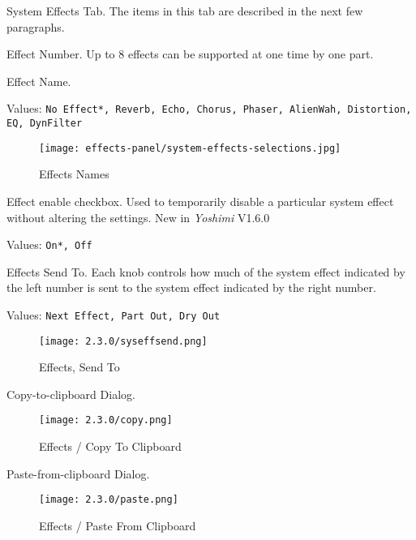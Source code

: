    \setcounter{ItemCounter}{0}      %

   System Effects Tab.
   The items in this tab are described in the next few paragraphs.

   Effect Number.
   Up to 8 effects can be supported at one time by one part.

   Effect Name.

   Values: \texttt{No Effect*, Reverb, Echo, Chorus, Phaser, AlienWah,
      Distortion, EQ, DynFilter}

\begin{figure}[H]
   \centering
   \texttt{[image: effects-panel/system-effects-selections.jpg]}
   \caption{Effects Names}
   \label{fig:effects_names}
\end{figure}

   Effect enable checkbox. Used to temporarily disable a particular system
   effect without altering the settings. New in \textsl{Yoshimi} V1.6.0

   Values: \texttt{On*, Off}

   Effects Send To.
   Each knob controls how much of the system effect indicated by the left
   number is sent to the system effect indicated by the right number.

   Values: \texttt{Next Effect, Part Out, Dry Out}

\begin{figure}[H]
   \centering
   \texttt{[image: 2.3.0/syseffsend.png]}
   \caption{Effects, Send To}
   \label{fig:effects_send_to}
\end{figure}

   Copy-to-clipboard Dialog.

\begin{figure}[H]
   \centering
   \texttt{[image: 2.3.0/copy.png]}
   \caption{Effects / Copy To Clipboard}
   \label{fig:effects_copy_to_clipboard}
\end{figure}

   Paste-from-clipboard Dialog.

\begin{figure}[H]
   \centering
   \texttt{[image: 2.3.0/paste.png]}
   \caption{Effects / Paste From Clipboard}
   \label{fig:effects_paste_from_clipboard}
\end{figure}

